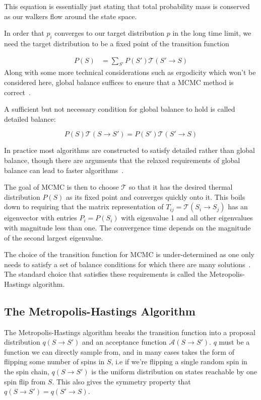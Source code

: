 This equation is essentially just stating that total probability mass is conserved as our walkers flow around the state space.

In order that \(p_i\) converges to our target distribution \(p\) in the long time limit, we need the target distribution to be a fixed point of the transition function

\[\begin{aligned}
P(S) &= \sum_{S'} P(S') \mathcal{T}(S' \rightarrow S)
\end{aligned}
\] Along with some more technical considerations such as ergodicity which won't be considered here, global balance suffices to ensure that a MCMC method is correct~\autocite{kellyReversibilityStochasticNetworks1981}.

A sufficient but not necessary condition for global balance to hold is called detailed balance:

\[
P(S) \mathcal{T}(S \rightarrow S') = P(S') \mathcal{T}(S' \rightarrow S)
\]

In practice most algorithms are constructed to satisfy detailed rather than global balance, though there are arguments that the relaxed requirements of global balance can lead to faster algorithms~\autocite{kapferSamplingPolytopeHarddisk2013}.

The goal of MCMC is then to choose \(\mathcal{T}\) so that it has the desired thermal distribution \(P(S)\) as its fixed point and converges quickly onto it. This boils down to requiring that the matrix representation of \(T_{ij} = \mathcal{T}(S_i \to S_j)\) has an eigenvector with entries \(P_i = P(S_i)\) with eigenvalue 1 and all other eigenvalues with magnitude less than one. The convergence time depends on the magnitude of the second largest eigenvalue.

The choice of the transition function for MCMC is under-determined as one only needs to satisfy a set of balance conditions for which there are many solutions~\autocite{kellyReversibilityStochasticNetworks1981}. The standard choice that satisfies these requirements is called the Metropolis-Hastings algorithm.

\hypertarget{the-metropolis-hastings-algorithm}{%
\subsection{The Metropolis-Hastings Algorithm}\label{the-metropolis-hastings-algorithm}}

The Metropolis-Hastings algorithm breaks the transition function into a proposal distribution \(q(S \to S')\) and an acceptance function \(\mathcal{A}(S \to S')\). \(q\) must be a function we can directly sample from, and in many cases takes the form of flipping some number of spins in \(S\), i.e if we're flipping a single random spin in the spin chain, \(q(S \to S')\) is the uniform distribution on states reachable by one spin flip from \(S\). This also gives the symmetry property that \(q(S \to S') = q(S' \to S)\).

